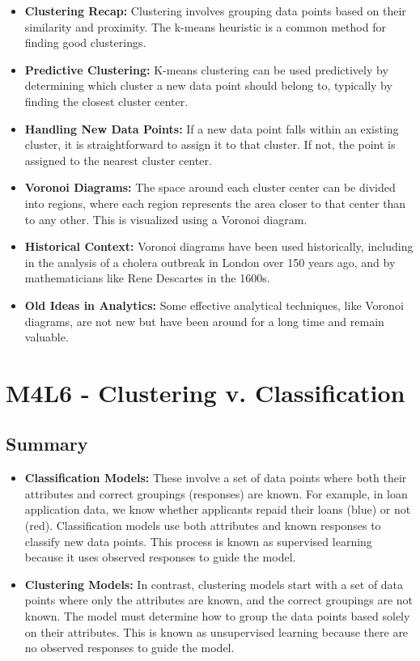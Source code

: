 \documentclass[
]{book}
\providecommand{\tightlist}{%
  \setlength{\itemsep}{0pt}\setlength{\parskip}{0pt}}
\begin{document}
\begin{itemize}
\tightlist
\item
  \textbf{Clustering Recap:} Clustering involves grouping data points based on their similarity and proximity. The k-means heuristic is a common method for finding good clusterings.
\item
  \textbf{Predictive Clustering:} K-means clustering can be used predictively by determining which cluster a new data point should belong to, typically by finding the closest cluster center.
\item
  \textbf{Handling New Data Points:} If a new data point falls within an existing cluster, it is straightforward to assign it to that cluster. If not, the point is assigned to the nearest cluster center.
\item
  \textbf{Voronoi Diagrams:} The space around each cluster center can be divided into regions, where each region represents the area closer to that center than to any other. This is visualized using a Voronoi diagram.
\item
  \textbf{Historical Context:} Voronoi diagrams have been used historically, including in the analysis of a cholera outbreak in London over 150 years ago, and by mathematicians like Rene Descartes in the 1600s.
\item
  \textbf{Old Ideas in Analytics:} Some effective analytical techniques, like Voronoi diagrams, are not new but have been around for a long time and remain valuable.
\end{itemize}

\section{M4L6 - Clustering v. Classification}\label{m4l6---clustering-v.-classification}

\subsection{Summary}\label{summary-5}

\begin{itemize}
\item
  \textbf{Classification Models:} These involve a set of data points where both their attributes and correct groupings (responses) are known. For example, in loan application data, we know whether applicants repaid their loans (blue) or not (red). Classification models use both attributes and known responses to classify new data points. This process is known as supervised learning because it uses observed responses to guide the model.
\item
  \textbf{Clustering Models:} In contrast, clustering models start with a set of data points where only the attributes are known, and the correct groupings are not known. The model must determine how to group the data points based solely on their attributes. This is known as unsupervised learning because there are no observed responses to guide the model.
\end{itemize}
\end{document}
